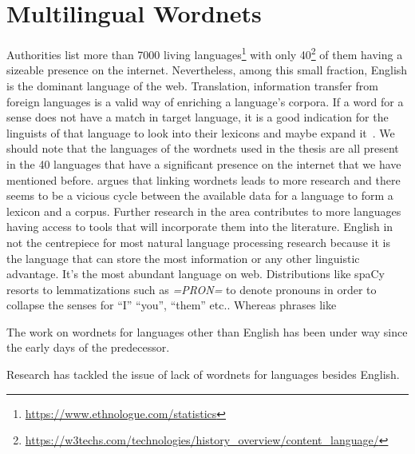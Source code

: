 \section{Multilingual Wordnets}%
\label{sec:multilingual_wordnets}
Authorities list more than 7000 living languages\footnote{\url{https://www.ethnologue.com/statistics}} with only 40\footnote{\url{https://w3techs.com/technologies/history_overview/content_language/}} of them having a sizeable presence on the internet.
Nevertheless, among this small fraction, English is the dominant language of the web.
Translation, information transfer from foreign languages is a valid way of enriching a language's corpora.
If a word for a sense does not have a match in target language, it is a good indication for the linguists of that language to look into their lexicons and maybe expand it~\cite{ibrahim_usta_turkce_2006}.
We should note that the languages of the wordnets used in the thesis are all present in the 40 languages that have a significant presence on the internet that we have mentioned before.
\textcite{sagot_building_2008} argues that linking wordnets leads to more research and there seems to be a vicious cycle between the available data for a language to form a lexicon and a corpus.
Further research in the area contributes to more languages having access to tools that will incorporate them into the literature.
English in not the centrepiece for most natural language processing research because it is the language that can store the most information or any other linguistic advantage.
It's the most abundant language on web.
Distributions like spaCy resorts to lemmatizations such as \emph{=PRON=} to denote pronouns in order to collapse the senses for \enquote{I} \enquote{you}, \enquote{them} etc.\@.
Whereas phrases like


The work on wordnets for languages other than English has been under way since the early days of the predecessor.

Research has tackled the issue of lack of wordnets for languages besides English. %

